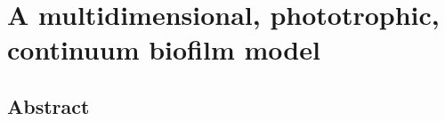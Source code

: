 \chapter[A multidimensional, phototrophic, continuum biofilm model]{A multidimensional, phototrophic, continuum biofilm model}
\label{chap:ch4}	%
\pagestyle{headings}

\section*{Abstract}

